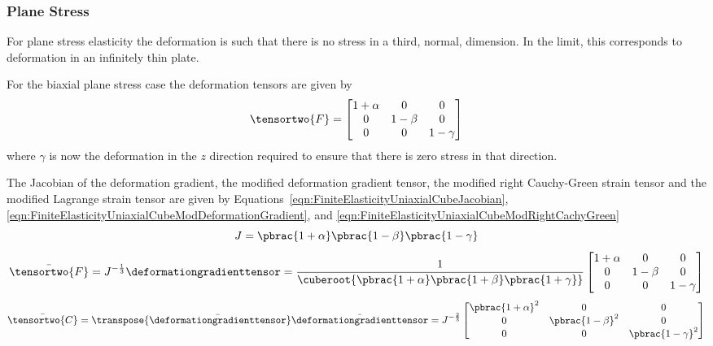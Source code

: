 \subsubsection{Plane Stress}
\label{subsubsec:FiniteElasticityPlaneStress}

For plane stress elasticity the deformation is such that there is no
stress in a third, normal, dimension. In the limit, this corresponds to deformation
in an infinitely thin plate.

For the biaxial plane stress case the deformation tensors are given by
\begin{equation}
  \tensortwo{F}=\begin{bmatrix}
  1+\alpha & 0 & 0 \\
  0 & 1-\beta & 0 \\
  0 & 0 & 1-\gamma
  \end{bmatrix}  
\end{equation}
where $\gamma$ is now the deformation in the $z$ direction required to ensure that there is zero stress in that direction.

The Jacobian of the deformation gradient, the modified deformation
gradient tensor, the modified right Cauchy-Green strain tensor and the
modified Lagrange strain tensor are given by
Equations~\ref{eqn:FiniteElasticityUniaxialCubeJacobian},\ref{eqn:FiniteElasticityUniaxialCubeModDeformationGradient},
and \ref{eqn:FiniteElasticityUniaxialCubeModRightCachyGreen} \ie
\begin{equation}
  J=\pbrac{1+\alpha}\pbrac{1-\beta}\pbrac{1-\gamma}
\end{equation}
\begin{equation}
  \bar{\tensortwo{F}}=J^{-\frac{1}{3}}\deformationgradienttensor=\frac{1}{\cuberoot{\pbrac{1+\alpha}\pbrac{1+\beta}\pbrac{1+\gamma}}}\begin{bmatrix}
      1+\alpha & 0 & 0 \\
      0 & 1-\beta & 0 \\
      0 & 0 & 1-\gamma
    \end{bmatrix}
\end{equation}
\begin{equation}
  \bar{\tensortwo{C}}=\transpose{\bar{\deformationgradienttensor}}\bar{\deformationgradienttensor}=J^{-\frac{2}{3}}\begin{bmatrix}
    \pbrac{1+\alpha}^{2} & 0 & 0 \\
    0 & \pbrac{1-\beta}^{2} & 0  \\
    0 & 0 & \pbrac{1-\gamma}^{2}
  \end{bmatrix}
\end{equation}

